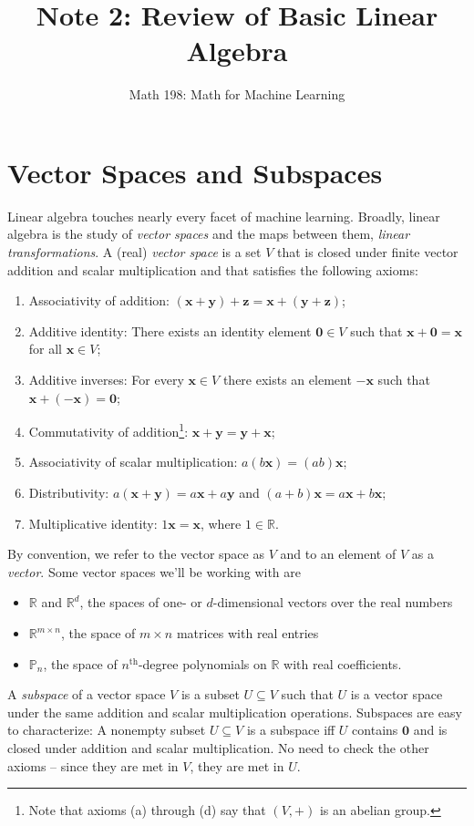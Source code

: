 \documentclass{article}
\title{Note 2: Review of Basic Linear Algebra}
\author{Math 198: Math for Machine Learning}
\date{}
\newcommand{\R}{\mathbb{R}}
\newcommand{\tit}{\textit}
\newcommand{\tbf}{\textbf}
\begin{document}
\maketitle

\section{Vector Spaces and Subspaces}
Linear algebra touches nearly every facet of machine learning. Broadly, linear algebra is the study of \textit{vector spaces} and the maps between them, \textit{linear transformations}. A (real) \textit{vector space} is a set $V$ that is closed under finite vector addition and scalar multiplication and that satisfies the following axioms:
\begin{enumerate}[label=(\alph*)]
\item Associativity of addition: $(\tbf{x}+\tbf{y})+\tbf{z} = \tbf{x}+(\tbf{y}+\tbf{z})$;
\item Additive identity: There exists an identity element $\tbf{0} \in V$ such that $\tbf{x}+\tbf{0} = \tbf{x}$ for all $\tbf{x} \in V$;
\item Additive inverses: For every $\tbf{x} \in V$ there exists an element $-\tbf{x}$ such that $\tbf{x} + (-\tbf{x}) = \tbf{0}$;
\item Commutativity of addition\footnote{Note that axioms (a) through (d) say that $(V, +)$ is an abelian group.}: $\tbf{x}+\tbf{y} = \tbf{y}+\tbf{x}$;
\item Associativity of scalar multiplication: $a(b\tbf{x}) = (ab)\tbf{x}$;
\item Distributivity: $a(\tbf{x}+\tbf{y}) = a\tbf{x} + a\tbf{y}$ and $(a+b)\tbf{x} = a\tbf{x} + b\tbf{x}$;
\item Multiplicative identity: $1\tbf{x} = \tbf{x}$, where $1 \in \mathbb{R}$.
\end{enumerate}
By convention, we refer to the vector space as $V$ and to an element of $V$ as a \tit{vector}. Some vector spaces we'll be working with are
\begin{itemize}
\item $\mathbb{R}$ and $\mathbb{R}^d$, the spaces of one- or $d$-dimensional vectors over the real numbers
\item $\mathbb{R}^{m \times n}$, the space of $m\times n$ matrices with real entries
\item $\mathbb{P}_n$, the space of $n^{\text{th}}$-degree polynomials on $\R$ with real coefficients.
\end{itemize}
A \tit{subspace} of a vector space $V$ is a subset $U \subseteq V$ such that $U$ is a vector space under the same addition and scalar multiplication operations. Subspaces are easy to characterize: A nonempty subset $U \subseteq V$ is a subspace iff $U$ contains $\tbf{0}$ and is closed under addition and scalar multiplication. No need to check the other axioms -- since they are met in $V$, they are met in $U$.
\end{document}
